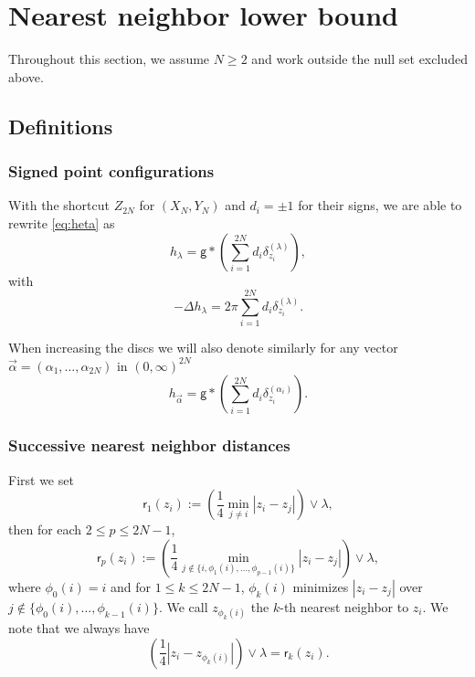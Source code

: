 \documentclass[a4paper,10pt,leqno]{amsart}
\numberwithin{equation}{section}
\def\g{\mathsf{g}}
\def\rr{\mathsf{r}}
\begin{document}
\section{Nearest neighbor lower bound}\label{sec2}
Throughout this section, we assume $N\ge2$ and work outside the null set excluded above.

\subsection{Definitions}
\subsubsection*{Signed point configurations} With the shortcut $Z_{2N}$ for $(X_N, Y_N)$ and $d_i=\pm 1$ for their signs,
we are able to rewrite \eqref{eq:heta} as
\begin{equation*}
  h_\lambda=\g* \left( \sum_{i=1}^{2N} d_i \delta_{z_i}^{(\lambda)}\right),
\end{equation*}
with
\begin{equation*} -\Delta h_\lambda= 2\pi \sum_{i=1}^{2N} d_i \delta_{z_i}^{(\lambda)}.\end{equation*}

When increasing the discs we will also denote similarly
for any vector $\vec{\alpha}=(\alpha_1, \dots , \alpha_{2N})$ in $(0,\infty)^{2N}$
\begin{equation}\label{defhalpha} h_{\vec{\alpha}} = \g* \left( \sum_{i=1}^{2N} d_i \delta_{z_i}^{(\alpha_i)} \right).\end{equation}

\subsubsection*{Successive nearest neighbor distances}
First we set
\begin{equation}\label{nn2}\rr_1(z_i):= \left(\frac14 \min_{j\neq i} |z_i-z_j| \right)\vee \lambda,
\end{equation} then for each $2\le p\le2N-1$,
\begin{equation}\label{nn3} \rr_p(z_i) := \left(\frac14 \min_{j\notin\{i, \phi_1(i) ,\dots, \phi_{p-1}(i)\}} |z_i-z_j|\right)\vee \lambda,\end{equation}
where $\phi_0(i)=i$ and for $1\le k\le2N-1$, $\phi_k(i)$ minimizes $|z_i-z_j|$ over $j\notin\{\phi_0(i),\ldots,\phi_{k-1}(i)\}$. We call $z_{\phi_k(i)}$ the $k$-th nearest neighbor to $z_i$.
We note that we always have
\begin{equation*} \left(\frac 14 |z_i -z_{\phi_k(i)}|\right) \vee \lambda= \rr_k(z_i).\end{equation*}
\end{document}
